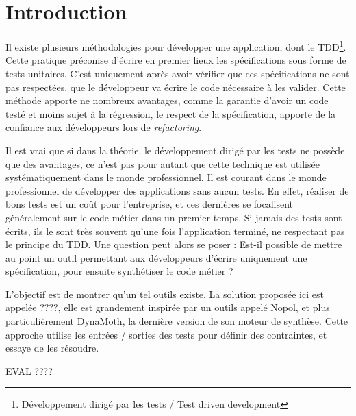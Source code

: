 \chapter*{Introduction}
	\thispagestyle{introduction}


\par Il existe plusieurs méthodologies pour développer une application, dont le TDD\footnote{Développement dirigé par les tests / Test driven development}. Cette pratique préconise d'écrire en premier lieux les spécifications sous forme de tests unitaires. C'est uniquement après avoir vérifier que ces spécifications ne sont pas respectées, que le développeur va écrire le code nécessaire à les valider. Cette méthode apporte ne nombreux avantages, comme la garantie d'avoir un code testé et moins sujet à la régression, le respect de la spécification, apporte de la confiance aux développeurs lors de \textit{refactoring}. 

\par Il est vrai que si dans la théorie, le développement dirigé par les tests ne possède que des avantages, ce n'est pas pour autant que cette technique est utilisée systématiquement dans le monde professionnel. Il est courant dans le monde professionnel de développer des applications sans aucun tests. En effet, réaliser de bons tests est un coût pour l'entreprise, et ces dernières se focalisent généralement sur le code métier dans un premier temps. Si jamais des tests sont écrits, ils le sont très souvent qu'une fois l'application terminé, ne respectant pas le principe du TDD. Une question peut alors se poser : Est-il possible de mettre au point un outil permettant aux développeurs d'écrire uniquement une spécification, pour ensuite synthétiser le code métier ?

\par L'objectif est de montrer qu'un tel outils existe. La solution proposée ici est appelée ????, elle est grandement inspirée par un outils appelé Nopol\cite{nopol}, et plus particulièrement DynaMoth\cite{dynamoth}, la dernière version de son moteur de synthèse. Cette approche utilise les entrées / sorties des tests pour définir des contraintes, et essaye de les résoudre.


\par EVAL ????